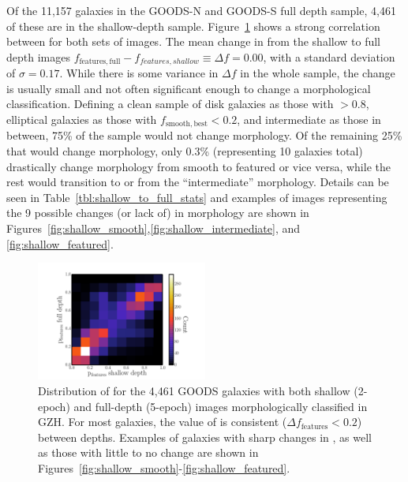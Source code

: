 \documentclass[twocolumn]{aastex6}
\begin{document}
Of the 11,157 galaxies in the GOODS-N and GOODS-S full depth sample, 4,461 of
these are in the shallow-depth sample. Figure~\ref{fig:shallow_vs_full} shows a
strong correlation between \ffeatures{} for both sets of images. The mean
change in \ffeatures{} from the shallow to full depth images
$f_\mathrm{features,full} - f_{features,shallow} \equiv \Delta f = 0.00$, with
a standard deviation of $\sigma = 0.17$. While there is some variance in
$\Delta f$ in the whole sample, the change is usually small and not often
significant enough to change a morphological classification. Defining a clean
sample of disk galaxies as those with \fbest$>0.8$, elliptical galaxies as
those with $f_\mathrm{smooth,best}<0.2$, and intermediate as those in between,
75\% of the sample would not change morphology. Of the remaining 25\% that
would change morphology, only 0.3\% (representing 10 galaxies total)
drastically change morphology from smooth to featured or vice versa, while the
rest would transition to or from the ``intermediate'' morphology. Details can
be seen in Table~\ref{tbl:shallow_to_full_stats} and examples of images
representing the 9 possible changes (or lack of) in morphology are shown in
Figures~\ref{fig:shallow_smooth},\ref{fig:shallow_intermediate}, and
\ref{fig:shallow_featured}.

\begin{figure}
\begin{center}
\includegraphics[width=0.50\textwidth]{figures/full_shallow_p_plot.pdf}
\caption{Distribution of \ffeatures{} for the 4,461 GOODS galaxies with both
shallow (2-epoch) and full-depth (5-epoch) images morphologically classified in
GZH. For most galaxies, the value of \ffeatures{} is consistent ($\Delta
f_\mathrm{features}<0.2$) between depths. Examples of galaxies with sharp
changes in \ffeatures, as well as those with little to no change are shown in
Figures~\ref{fig:shallow_smooth}-\ref{fig:shallow_featured}.}
\label{fig:shallow_vs_full}
\end{center}
\end{figure}
\end{document}
